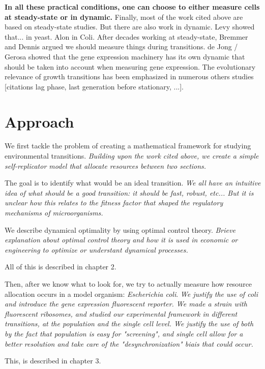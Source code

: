 \textbf{In all these practical conditions, one can choose to either measure cells at steady-state or in dynamic.}
Finally, most of the work cited above are based on steady-state studies.
But there are also work in dynamic.
Levy showed that... in yeast.
Alon in Coli.
After decades working at steady-state, Bremmer and Dennis argued we should measure things during transitions.
de Jong / Gerosa showed that the gene expression machinery has its own dynamic that should be taken into account when measuring gene expression.
The evolutionary relevance of growth transitions has been emphasized in numerous others studies [citations lag phase, last generation before stationary, ...].

\section{Approach}
\label{sec:approach}

We first tackle the problem of creating a mathematical framework for studying environmental transitions.
\textit{Building upon the work cited above, we create a simple self-replicator model that allocate resources between two sections.}

The goal is to identify what would be an ideal transition.
\textit{We all have an intuitive idea of what should be a good transition: it should be fast, robust, etc... But it is unclear how this relates to the fitness factor that shaped the regulatory mechanisms of microorganisms.}

We describe dynamical optimality by using optimal control theory.
\textit{Brieve explanation about optimal control theory and how it is used in economic or engineering to optimize or understant dynamical processes.}

All of this is described in chapter 2.

Then, after we know what to look for, we try to actually measure how resource allocation occurs in a model organism: \textit{Escherichia coli}.
\textit{We justify the use of coli and introduce the gene expression fluorescent reporter.
We made a strain with fluorescent ribosomes, and studied our experimental framework in different transitions, at the population and the single cell level.
We justify the use of both by the fact that population is easy for "screening", and single cell allow for a better resolution and take care of the "desynchronization" biais that could occur.}

This, is described in chapter 3.